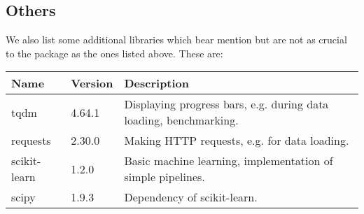 \subsection*{Others}


We also list some additional libraries which bear mention but are not as crucial to the package as the ones listed above. These are:

\begin{table}[htbp]
    \centering
    \begin{tabular}{lll}
        \toprule
        \textbf{Name} & \textbf{Version} & \textbf{Description} \\
        \midrule
        tqdm & 4.64.1 & Displaying progress bars, e.g. during data loading, benchmarking. \\
        requests & 2.30.0 & Making HTTP requests, e.g. for data loading. \\
        scikit-learn & 1.2.0 & Basic machine learning, implementation of simple pipelines. \\
        scipy & 1.9.3 & Dependency of scikit-learn. \\

        \bottomrule
    \end{tabular}
\end{table}
